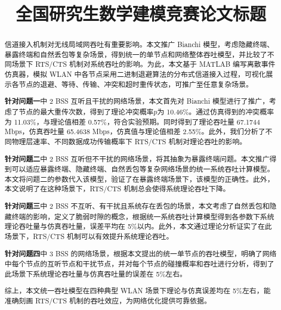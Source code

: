 \documentclass[bwprint]{gmcmthesis}
\title{全国研究生数学建模竞赛论文标题}
\begin{document}
\maketitle

\begin{abstract}
信道接入机制对无线局域网吞吐有重要影响。本文推广 Bianchi 模型，考虑隐藏终端、暴露终端和自然丢包等复杂场景，得到统一的单节点和网络整体吞吐模型，并比较了不同场景下 RTS/CTS 机制对系统吞吐的影响。为此，本文基于 MATLAB 编写离散事件仿真器，模拟 WLAN 中各节点采用二进制退避算法的分布式信道接入过程，可视化展示各节点的退避、等待、传输、冲突和超时重传状态，可推广至任意复杂场景。

\textbf{针对问题一}中 2 BSS 互听且干扰的网络场景，本文首先对 Bianchi 模型进行了推广，考虑了节点的最大重传次数，得到了理论冲突概率$p$为 10.46\%。通过仿真得到的冲突概率为 11.03\%，与理论值相差 0.57\%，符合实验预期。同时得到了理论吞吐量 67.1744 Mbps，仿真吞吐量 65.4638 Mbps，仿真值与理论值相差 2.55\%。此外，我们分析了不同物理层速率、不同数据成功传输概率下 RTS/CTS 机制对理论吞吐的影响。

\textbf{针对问题二}中 2 BSS 互听但不干扰的网络场景，将其抽象为暴露终端问题。本文推广得到可以适应暴露终端、隐藏终端、自然丢包等复杂网络场景的统一系统吞吐计算模型。本文将问题二的参数代入该模型，验证了在暴露终端场景下，该模型的正确性。此外，本文说明了在这种场景下，RTS/CTS 机制总会使得系统理论吞吐下降。

\textbf{针对问题三}中 2 BSS 不互听、有干扰且系统存在丢包的场景，本文考虑了自然丢包和隐藏终端的影响，定义了脆弱时隙的概念，根据统一系统吞吐计算模型得到各参数下系统理论吞吐量与仿真吞吐量，误差平均在 5\%以内。此外，本文通过理论分析证实了在此场景下，RTS/CTS 机制可以有效提升系统理论吞吐。

\textbf{针对问题四}中 3 BSS 的网络场景，根据本文提出的统一单节点的吞吐模型，明确了网络中每个节点的互听节点和干扰节点，并对每个节点的碰撞概率和吞吐进行分析，得到了此场景下系统理论吞吐量与仿真吞吐量的误差在 5\%左右。

综上，本文统一吞吐模型在四种典型 WLAN 场景下理论与仿真误差均在 5\%左右，能准确刻画 RTS/CTS 机制的吞吐效应，为网络优化提供可靠依据。


\end{abstract}

\pagestyle{plain}

\maketoc

\clearpage
\end{document}
